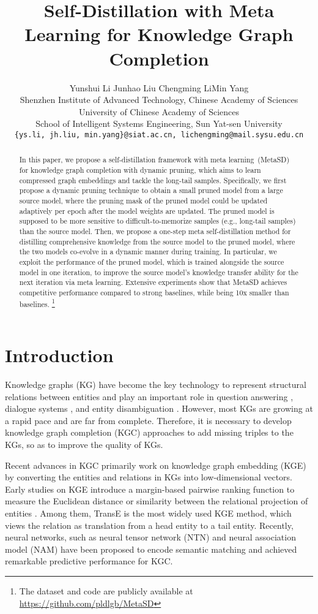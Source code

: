 \documentclass[11pt]{article}
\title{Self-Distillation with Meta Learning for Knowledge Graph Completion}
\author{Yunshui Li \quad  Junhao Liu  \quad Chengming Li\footnotemark[1] \quad Min Yang\footnotemark[1] \\
        Shenzhen Institute of Advanced Technology, Chinese Academy of Sciences \\
        University of Chinese Academy of Sciences \\
        School of Intelligent Systems Engineering, Sun Yat-sen University\\
        \texttt{\{ys.li, jh.liu, min.yang\}@siat.ac.cn, lichengming@mail.sysu.edu.cn}
        }
\renewcommand{\thefootnote}{\fnsymbol{footnote}}
\begin{document}
\maketitle
\renewcommand{\thefootnote}{\fnsymbol{footnote}}
\renewcommand{\thefootnote}{\arabic{footnote}}

\begin{abstract}
In this paper, we propose a self-distillation framework with meta learning~(MetaSD) for knowledge graph completion with dynamic pruning, which aims to learn compressed graph embeddings and tackle the long-tail samples. Specifically, we first propose a dynamic pruning technique to obtain a small pruned model from a large source model, where the pruning mask of the pruned model could be updated adaptively per epoch after the model weights are updated. The pruned model is supposed to be more sensitive to difficult-to-memorize samples (e.g., long-tail samples) than the source model. 
Then, we propose a one-step meta self-distillation method for distilling comprehensive knowledge from the source model to the pruned model, where the two models co-evolve in a dynamic manner during training.
In particular, we exploit the performance of the pruned model, which is trained alongside the source model in one iteration, to improve the source model's knowledge transfer ability for the next iteration via meta learning.
Extensive experiments show that MetaSD achieves competitive performance compared to strong baselines, while being 10x smaller than baselines. \footnote{The dataset and code are publicly available at \url{https://github.com/pldlgb/MetaSD}}
\end{abstract}

\section{Introduction}
Knowledge graphs (KG) have become the key technology to represent structural relations between entities and play an important role in question answering \cite{shen2018knowledge}, dialogue systems \cite{yan2017building}, and entity disambiguation \cite{mulang2020evaluating,si2022scl,si2023santa}.
However, most KGs are growing at a rapid pace and are far from complete. Therefore, it is necessary to develop knowledge graph completion (KGC) approaches to add missing triples to the KGs, so as to improve the quality of KGs. 

Recent advances in KGC primarily work on knowledge graph embedding (KGE) by converting the entities and relations in KGs into low-dimensional vectors. Early studies on KGE introduce a margin-based pairwise ranking function to measure the Euclidean distance or similarity between the relational projection of entities \cite{nickel2011three,bordes2013translating,yang2014embedding,trouillon2016complex}. Among them, TransE \cite{bordes2013translating} is the most widely used KGE method, which views the relation as translation from a head entity to a tail entity. 
Recently, neural networks, such as neural tensor network (NTN) \cite{socher2013reasoning} and neural association model (NAM) \cite{liu2016probabilistic} have been proposed to encode semantic matching and achieved remarkable predictive performance for KGC. 
\end{document}
